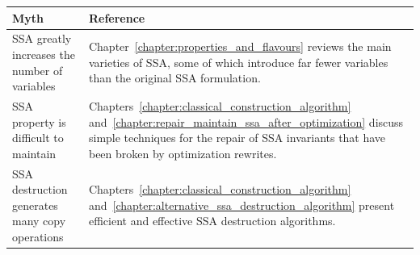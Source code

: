 \begin{center}
\small
\begin{tabular}{|p{}|p{}|}
\hline
Myth & Reference \\ \hline \hline
SSA greatly increases the number of variables &
Chapter~\ref{chapter:properties_and_flavours} reviews the main varieties of
SSA, some of which introduce far fewer variables\index{variables, number of}
than the original SSA formulation. \\ \hline
SSA property is difficult to maintain & 
Chapters~\ref{chapter:classical_construction_algorithm} and~\ref{chapter:repair_maintain_ssa_after_optimization}  discuss simple techniques 
for the repair of SSA invariants that have been
broken by optimization rewrites.\\ \hline
SSA destruction\index{SSA destruction} generates many copy\index{copy, insertion} operations & 
Chapters~\ref{chapter:classical_construction_algorithm} and~\ref{chapter:alternative_ssa_destruction_algorithm} present efficient and effective SSA destruction algorithms. \\ \hline
\end{tabular}
\end{center}

